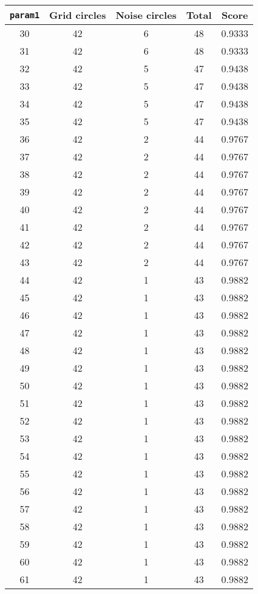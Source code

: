 \documentclass[letterpaper, 12pt]{article}
\begin{document}
\begin{longtable}{|c|c|c|c|c|}
\hline
\textbf{\texttt{param1}} & \textbf{Grid circles} & \textbf{Noise circles} & \textbf{Total} & \textbf{Score} \\
\hline
30 & 42 & 6 & 48 & 0.9333 \\
\hline
31 & 42 & 6 & 48 & 0.9333 \\
\hline
32 & 42 & 5 & 47 & 0.9438 \\
\hline
33 & 42 & 5 & 47 & 0.9438 \\
\hline
34 & 42 & 5 & 47 & 0.9438 \\
\hline
35 & 42 & 5 & 47 & 0.9438 \\
\hline
36 & 42 & 2 & 44 & 0.9767 \\
\hline
37 & 42 & 2 & 44 & 0.9767 \\
\hline
38 & 42 & 2 & 44 & 0.9767 \\
\hline
39 & 42 & 2 & 44 & 0.9767 \\
\hline
40 & 42 & 2 & 44 & 0.9767 \\
\hline
41 & 42 & 2 & 44 & 0.9767 \\
\hline
42 & 42 & 2 & 44 & 0.9767 \\
\hline
43 & 42 & 2 & 44 & 0.9767 \\
\hline
44 & 42 & 1 & 43 & 0.9882 \\
\hline
45 & 42 & 1 & 43 & 0.9882 \\
\hline
46 & 42 & 1 & 43 & 0.9882 \\
\hline
47 & 42 & 1 & 43 & 0.9882 \\
\hline
48 & 42 & 1 & 43 & 0.9882 \\
\hline
49 & 42 & 1 & 43 & 0.9882 \\
\hline
50 & 42 & 1 & 43 & 0.9882 \\
\hline
51 & 42 & 1 & 43 & 0.9882 \\
\hline
52 & 42 & 1 & 43 & 0.9882 \\
\hline
53 & 42 & 1 & 43 & 0.9882 \\
\hline
54 & 42 & 1 & 43 & 0.9882 \\
\hline
55 & 42 & 1 & 43 & 0.9882 \\
\hline
56 & 42 & 1 & 43 & 0.9882 \\
\hline
57 & 42 & 1 & 43 & 0.9882 \\
\hline
58 & 42 & 1 & 43 & 0.9882 \\
\hline
59 & 42 & 1 & 43 & 0.9882 \\
\hline
60 & 42 & 1 & 43 & 0.9882 \\
\hline
61 & 42 & 1 & 43 & 0.9882 \\

\end{longtable}
\end{document}
